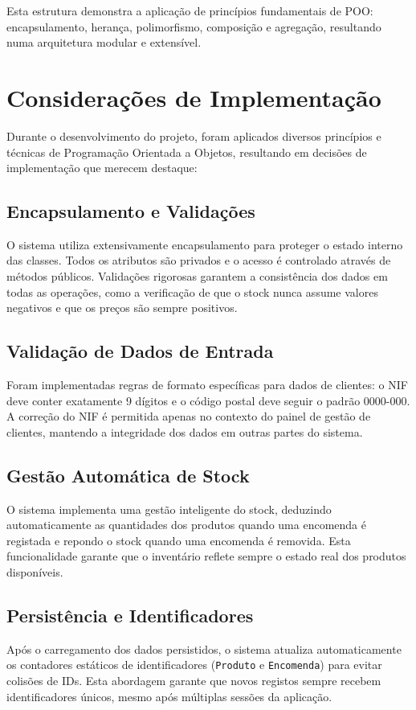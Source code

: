 \documentclass[a4paper,12pt]{article}
\begin{document}
Esta estrutura demonstra a aplicação de princípios fundamentais de POO: encapsulamento, herança, polimorfismo, composição e agregação, resultando numa arquitetura modular e extensível.

\section{Considerações de Implementação}

Durante o desenvolvimento do projeto, foram aplicados diversos princípios e técnicas de Programação Orientada a Objetos, resultando em decisões de implementação que merecem destaque:

\subsection{Encapsulamento e Validações}
O sistema utiliza extensivamente encapsulamento para proteger o estado interno das classes. Todos os atributos são privados e o acesso é controlado através de métodos públicos. Validações rigorosas garantem a consistência dos dados em todas as operações, como a verificação de que o stock nunca assume valores negativos e que os preços são sempre positivos.

\subsection{Validação de Dados de Entrada}
Foram implementadas regras de formato específicas para dados de clientes: o NIF deve conter exatamente 9 dígitos e o código postal deve seguir o padrão 0000-000. A correção do NIF é permitida apenas no contexto do painel de gestão de clientes, mantendo a integridade dos dados em outras partes do sistema.

\subsection{Gestão Automática de Stock}
O sistema implementa uma gestão inteligente do stock, deduzindo automaticamente as quantidades dos produtos quando uma encomenda é registada e repondo o stock quando uma encomenda é removida. Esta funcionalidade garante que o inventário reflete sempre o estado real dos produtos disponíveis.

\subsection{Persistência e Identificadores}
Após o carregamento dos dados persistidos, o sistema atualiza automaticamente os contadores estáticos de identificadores (\texttt{Produto} e \texttt{Encomenda}) para evitar colisões de IDs. Esta abordagem garante que novos registos sempre recebem identificadores únicos, mesmo após múltiplas sessões da aplicação.
\end{document}
